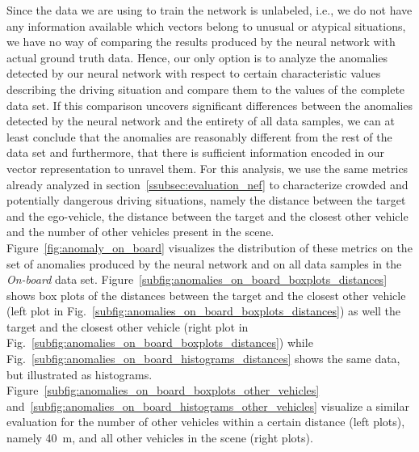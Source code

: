 Since the data we are using to train the network is unlabeled, i.e., we do not have any information available which vectors belong to unusual or atypical situations, we have no way of comparing the results produced by the neural network with actual ground truth data.
Hence, our only option is to analyze the anomalies detected by our neural network with respect to certain characteristic values describing the driving situation and compare them to the values of the complete data set.
If this comparison uncovers significant differences between the anomalies detected by the neural network and the entirety of all data samples, we can at least conclude that the anomalies are reasonably different from the rest of the data set and furthermore, that there is sufficient information encoded in our vector representation to unravel them.
For this analysis, we use the same metrics already analyzed in section~\ref{ssubsec:evaluation_nef} to characterize crowded and potentially dangerous driving situations, namely the distance between the target and the ego-vehicle, the distance between the target and the closest other vehicle and the number of other vehicles present in the scene.
Figure~\ref{fig:anomaly_on_board} visualizes the distribution of these metrics on the set of anomalies produced by the neural network and on all data samples in the \emph{On-board} data set.
Figure~\ref{subfig:anomalies_on_board_boxplots_distances} shows box plots of the distances between the target and the closest other vehicle (left plot in Fig.~\ref{subfig:anomalies_on_board_boxplots_distances}) as well the target and the closest other vehicle (right plot in Fig.~\ref{subfig:anomalies_on_board_boxplots_distances}) while Fig.~\ref{subfig:anomalies_on_board_histograms_distances} shows the same data, but illustrated as histograms.
Figure~\ref{subfig:anomalies_on_board_boxplots_other_vehicles} and~\ref{subfig:anomalies_on_board_histograms_other_vehicles} visualize a similar evaluation for the number of other vehicles within a certain distance (left plots), namely \SI{40}{\meter}, and all other vehicles in the scene (right plots).

